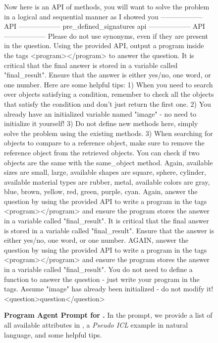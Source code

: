 \begin{figure*}[t]
\begin{prompt}
Now here is an API of methods, you will want to solve the problem in a logical and sequential manner as I showed you
------------------ API ------------------
{pre_defined_signatures}
{api}
------------------ API ------------------
Please do not use synonyms, even if they are present in the question.
Using the provided API, output a program inside the tags <program></program> to answer the question. 
It is critical that the final answer is stored in a variable called "final_result".
Ensure that the answer is either yes/no, one word, or one number.
Here are some helpful tips: 
1) When you need to search over objects satisfying a condition, remember to check all the objects that satisfy the condition and don't just return the first one. 
2) You already have an initialized variable named "image" - no need to initialize it yourself! 3) Do not define new methods here, simply solve the problem using the existing methods.
3) When searching for objects to compare to a reference object, make sure to remove the reference object from the retrieved objects. You can check if two objects are the same with the same_object method.
Again, available sizes are {{small, large}}, available shapes are {{square, sphere, cylinder}}, available material types are {{rubber, metal}}, available colors are {{gray, blue, brown, yellow, red, green, purple, cyan}}.
Again, answer the question by using the provided API to write a program in the tags <program></program> and ensure the program stores the answer in a variable called "final_result".
It is critical that the final answer is stored in a variable called "final_result".
Ensure that the answer is either yes/no, one word, or one number.
AGAIN, answer the question by using the provided API to write a program in the tags <program></program> and ensure the program stores the answer in a variable called "final_result".
You do not need to define a function to answer the question - just write your program in the tags. Assume "image" has already been initialized - do not modify it!
<question>{question}</question>
\end{prompt}
\caption{\textbf{Program Agent Prompt for \clevr.} In the prompt, we provide a list of all available attributes in \clevr, a \emph{Pseudo ICL} example in natural language, and some helpful tips.}
\label{fig:program_prompt_clevr}

\end{figure*}